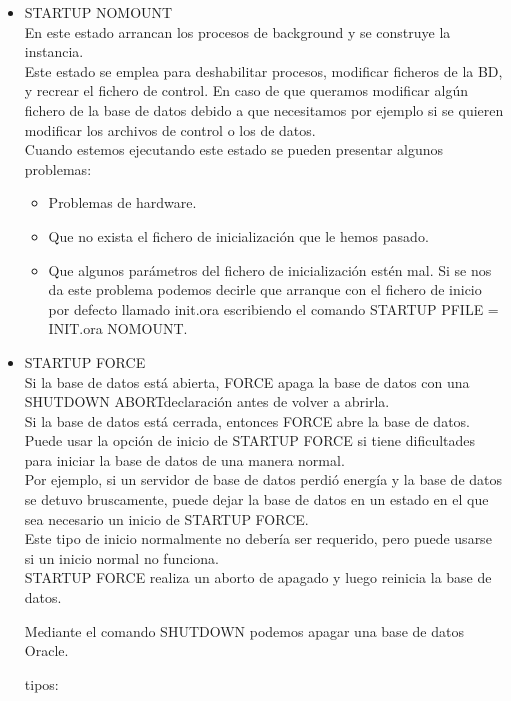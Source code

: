 \begin{itemize}
\begin{itemize}
		\end{itemize}
	\item STARTUP NOMOUNT
	\\En este estado arrancan los procesos de background y se construye la instancia.
	\\Este estado se emplea para deshabilitar procesos, modificar ficheros de la BD, y recrear el
	fichero de control. En caso de que queramos modificar algún fichero de la base de datos debido a
	que necesitamos por ejemplo si se quieren modificar los archivos de control o los de datos.
	\\Cuando estemos ejecutando este estado se pueden presentar algunos problemas:		
		\begin{itemize}
			\item Problemas de hardware.
			\item Que no exista el fichero de inicialización que le hemos pasado.
			\item Que algunos parámetros del fichero de inicialización estén mal. Si se nos da este
			problema podemos decirle que arranque con el fichero de inicio por defecto llamado	
			init.ora escribiendo el comando STARTUP PFILE = INIT.ora NOMOUNT.			
		\end{itemize}
	\item STARTUP FORCE
	\\Si la base de datos está abierta, FORCE apaga la base de datos con una SHUTDOWN ABORTdeclaración antes de volver a abrirla. 
	\\Si la base de datos está cerrada, entonces FORCE  abre la base de datos.
	\\Puede usar la opción de inicio de STARTUP FORCE si tiene dificultades para iniciar la base de datos de una manera normal. 
	\\Por ejemplo, si un servidor de base de datos perdió energía y la base de datos se detuvo bruscamente, puede dejar la base de datos en un estado en 		el que sea necesario un inicio de STARTUP FORCE. 
	\\Este tipo de inicio normalmente no debería ser requerido, pero puede usarse si un inicio normal no funciona. 
	\\STARTUP FORCE realiza un aborto de apagado y luego reinicia la base de datos.

\vspace*{0.20in}
\vspace*{0.1in}
\begin{large}
Mediante el comando SHUTDOWN podemos apagar una base de datos Oracle. \\
\end{large}
tipos:


\end{itemize}
